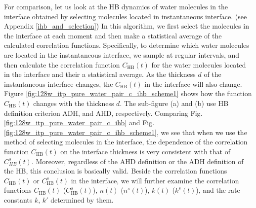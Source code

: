{For comparison, let us look at the HB dynamics of water molecules in the interface obtained by selecting molecules 
located in instantaneous interface. (see Appendix \ref{ihb_and_selection}) 
In this algorithm, we first select the molecules in the interface at each moment and then make a statistical
average of the calculated correlation functions.
Specifically, to determine which water molecules are located in the instantaneous interface, we sample at regular intervals, and then calculate 
the correlation function $C_\text{HB}(t)$ for the water molecules located in the interface and their a statistical average.
As the thickness $d$ of the instantaneous interface changes, the $C_\text{HB}(t)$ in the interface will also change. 
Figure \ref{fig:128w_itp_pure_water_pair_c_ihb_scheme1} shows how the function $C_\text{HB}(t)$ changes with the thickness $d$.
The sub-figure (a) and (b) use HB definition criterion ADH, and AHD, respectively.
Comparing Fig.\thinspace\ref{fig:128w_itp_pure_water_pair_c_ihb} and Fig.\thinspace\ref{fig:128w_itp_pure_water_pair_c_ihb_scheme1}, we see that
when we use the method of selecting molecules in the interface, the dependence of the correlation function $C_\text{HB}(t)$  
on the interface thickness is very consistent with that of $C^s_{HB}(t)$. Moreover, regardless of the AHD definition 
or the ADH definition of the HB, this conclusion is basically valid. Beside the correlation functions $C_\text{HB}(t)$ or $C^s_\text{HB}(t)$ in the interface, we will further examine the correlation 
functions $C_\text{HB}(t)$ ($C^s_\text{HB}(t)$), $n(t)$ ($n^s(t)$), $k(t)$ ($k^s(t)$), and the rate constants $k$, $k'$ determined by them.

}
